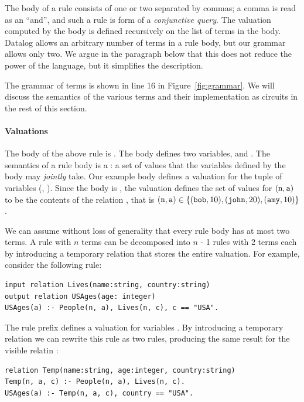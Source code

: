 The body of a rule consists of one or two  separated by commas;
a comma is read as an ``and'', and such a rule is form of a \emph{conjunctive query}.
The valuation computed by the body is defined recursively on the list of terms
in the body.  Datalog allows an arbitrary number of terms in a rule body,
but our grammar allows only two.  We argue in the paragraph below that
this does not reduce the power of the language, but it simplifies the
description.

The grammar of terms is shown in line 16 in Figure~\ref{fig:grammar}.  We will discuss
the semantics of the various terms and their implementation as circuits in the rest of this section.

\paragraph{Valuations}

The body of the above rule is .  The body defines
two variables,  and .
The semantics of a rule body is a : 
a set of values that the variables defined by the body may \emph{jointly} take.
Our example body defines a valuation for the tuple of variables (, ).
Since the body is , the valuation defines the set of values for $(\mbox{\texttt{n}},\mbox{\texttt{a}})$
to be the contents of the relation , that is $(\mbox{\texttt{n}},\mbox{\texttt{a}}) \in \{ (\mbox{\texttt{bob}}, 10),
(\mbox{\texttt{john}},20), (\mbox{\texttt{amy}}, 10) \}$.

We can assume without loss of generality that every rule body has at most two terms.
A rule with $n$ terms can be decomposed into $n$ - 1 rules with 2 terms each by introducing
a temporary relation that stores the entire valuation.
For example, consider the following rule:

\begin{lstlisting}[language=ddlog]
input relation Lives(name:string, country:string)
output relation USAges(age: integer)
USAges(a) :- People(n, a), Lives(n, c), c == "USA".
\end{lstlisting}

The rule prefix  defines a valuation for
variables .  By introducing a temporary relation 
 we can rewrite this rule as two rules, producing the same
result for the visible relatin :

\begin{lstlisting}[language=ddlog]
relation Temp(name:string, age:integer, country:string)
Temp(n, a, c) :- People(n, a), Lives(n, c).
USAges(a) :- Temp(n, a, c), country == "USA".
\end{lstlisting}


